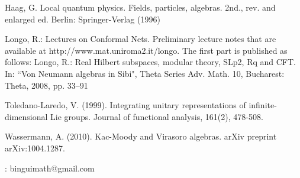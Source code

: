 \documentclass[12pt,b5paper,notitlepage]{article}
\theoremstyle{definition}
\theoremstyle{plain}
\numberwithin{equation}{section}
\begin{document}
\begin{thebibliography}{999999}
Haag, G. Local quantum physics. Fields, particles, algebras. 2nd., rev. and enlarged ed. Berlin: Springer-Verlag (1996)

Longo, R.: Lectures on Conformal Nets. Preliminary lecture notes that are available at http://www.mat.uniroma2.it/longo. The first part is published as follows: Longo, R.: Real Hilbert subspaces, modular theory, SLp2, Rq and CFT. In: ``Von Neumann algebras in Sibi", Theta Series Adv. Math. 10, Bucharest: Theta, 2008, pp. 33–91

Toledano-Laredo, V. (1999). Integrating unitary representations of infinite-dimensional Lie groups. Journal of functional analysis, 161(2), 478-508.

Wassermann, A. (2010). Kac-Moody and Virasoro algebras. arXiv preprint arXiv:1004.1287.







\end{thebibliography}

: binguimath@gmail.com
\end{document}
